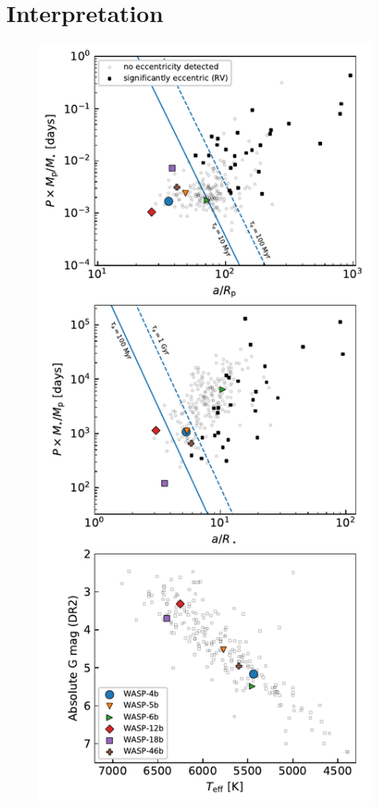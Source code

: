 \documentclass[12pt,twocolumn,tighten]{aastex62}
\begin{document}
{\section{Interpretation}
\label{sec:implications}

\begin{figure}[t]
  \begin{center}
    \includegraphics[height=0.88\textheight]{f5.pdf}

\end{center}
\end{figure}}
\end{document}
